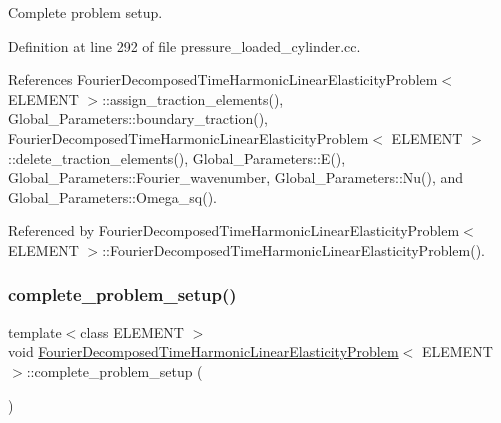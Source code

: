 Complete problem setup. 

Definition at line 292 of file pressure\+\_\+loaded\+\_\+cylinder.\+cc.



References Fourier\+Decomposed\+Time\+Harmonic\+Linear\+Elasticity\+Problem$<$ E\+L\+E\+M\+E\+N\+T $>$\+::assign\+\_\+traction\+\_\+elements(), Global\+\_\+\+Parameters\+::boundary\+\_\+traction(), Fourier\+Decomposed\+Time\+Harmonic\+Linear\+Elasticity\+Problem$<$ E\+L\+E\+M\+E\+N\+T $>$\+::delete\+\_\+traction\+\_\+elements(), Global\+\_\+\+Parameters\+::\+E(), Global\+\_\+\+Parameters\+::\+Fourier\+\_\+wavenumber, Global\+\_\+\+Parameters\+::\+Nu(), and Global\+\_\+\+Parameters\+::\+Omega\+\_\+sq().



Referenced by Fourier\+Decomposed\+Time\+Harmonic\+Linear\+Elasticity\+Problem$<$ E\+L\+E\+M\+E\+N\+T $>$\+::\+Fourier\+Decomposed\+Time\+Harmonic\+Linear\+Elasticity\+Problem().

\mbox{\label{classFourierDecomposedTimeHarmonicLinearElasticityProblem_aeb3e1638026cb1cabf1b16a32496f63c}} 
\subsubsection{\texorpdfstring{complete\+\_\+problem\+\_\+setup()}{complete\_problem\_setup()}\hspace{0.1cm}{\footnotesize\ttfamily [2/2]}}
{\footnotesize\ttfamily template$<$class E\+L\+E\+M\+E\+NT $>$ \\
void \hyperlink{classFourierDecomposedTimeHarmonicLinearElasticityProblem}{Fourier\+Decomposed\+Time\+Harmonic\+Linear\+Elasticity\+Problem}$<$ E\+L\+E\+M\+E\+NT $>$\+::complete\+\_\+problem\+\_\+setup (\begin{DoxyParamCaption}{ }\end{DoxyParamCaption})\hspace{0.3cm}{\ttfamily [private]}}



